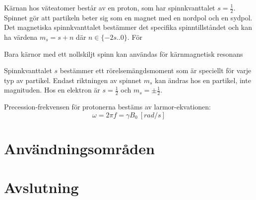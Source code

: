 \documentclass[11pt, a4paper]{article}
\begin{document}
Kärnan hos väteatomer består av en proton, som har spinnkvanttalet $s=\frac{1}{2}$. Spinnet gör att partikeln beter sig som en magnet med en nordpol och en sydpol. Det magnetiska spinnkvanttalet bestämmer det specifika spinntillståndet och kan ha värdena $m_s=s+n$ där $n\in\{-2s..0\}$. För 

Bara kärnor med ett nollskiljt spinn kan användas för kärnmagnetisk resonans

Spinnkvanttalet $s$ bestämmer ett rörelsemängdsmoment som är speciellt för varje typ av partikel. Endast riktningen av spinnet $m_s$ kan ändras hos en partikel, inte magnituden. Hos en elektron är $s=\frac{1}{2}$ och $m_s=\pm\frac{1}{2}$.

Precession-frekvensen för protonerna bestäms av larmor-ekvationen:
\begin{equation}
	\omega=2\pi f=\gamma B_0\:[\si{rad/s}]
\end{equation}

\clearpage
\section{Användningsområden}


\clearpage
\section{Avslutning}

\clearpage
\printbibliography
\end{document}
